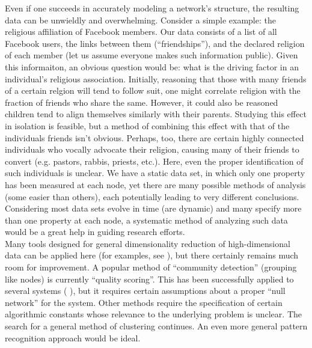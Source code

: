 \documentclass[11pt]{article}
\begin{document}
Even if one succeeds in accurately modeling a network's structure, the resulting data can be unwieldly and overwhelming. Consider a simple example: the religious affiliation of Facebook members. Our data consists of a list of all Facebook users, the links between them (``friendships''), and the declared religion of each member (let us assume everyone makes such information public). Given this informaiton, an obvious question would be: what is the driving factor in an individual's religious association. Initially, reasoning that those with many friends of a certain relgion will tend to follow suit, one might correlate religion with the fraction of friends who share the same. However, it could also be reasoned children tend to align themselves similarly with their parents. Studying this effect in isolation is feasible, but a method of combining this effect with that of the individuals friends isn't obvious. Perhaps, too, there are certain highly connected individuals who vocally advocate their religion, causing many of their friends to convert (e.g. pastors, rabbis, priests, etc.). Here, even the proper identification of such individuals is unclear. We have a static data set, in which only one property has been measured at each node, yet there are many possible methods of analysis (some easier than others), each potentially leading to very different conclusions. Considering most data sets evolve in time (are dynamic) and many specify more than one property at each node, a systematic method of analyzing such data would be a great help in guiding research efforts. \vspace{1mm}\\
Many tools designed for general dimensionality reduction of high-dimensional data can be applied here (for examples, see \cite{diffusion distances} \cite{clustering}), but there certainly remains much room for improvement. A popular method of ``community detection'' (grouping like nodes) is currently ``quality scoring''. This has been successfully applied to several systems (\cite{basset} \cite{more bassett}), but it requires certain assumptions about a proper ``null network'' for the system. Other methods require the specification of certain algorithmic constants whose relevance to the underlying problem is unclear. The search for a general method of clustering continues. An even more general pattern recognition approach would be ideal.\vspace{1mm}\\
\end{document}
